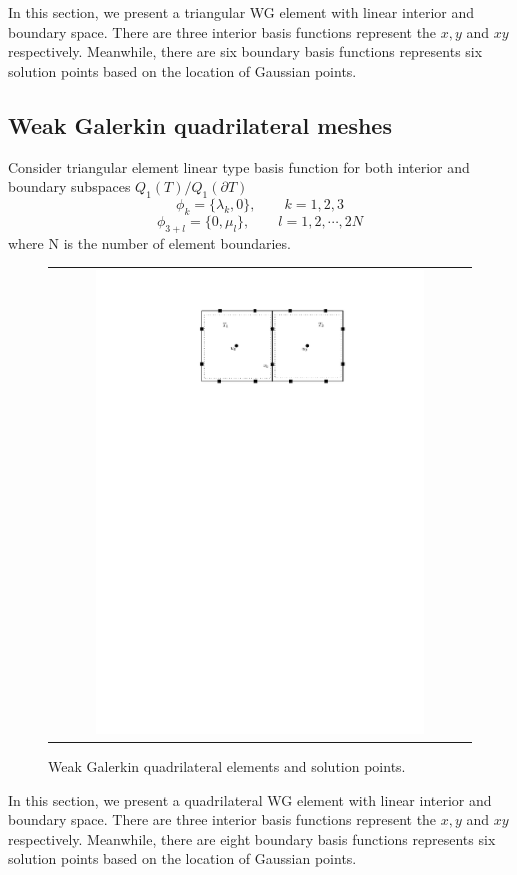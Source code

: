 In this section, we present a triangular WG element with linear interior and boundary space. There are three interior basis functions represent the $ x, y $ and $ xy $ respectively. Meanwhile, there are six boundary basis functions represents six solution points based on the location of Gaussian points.

\subsection{Weak Galerkin quadrilateral meshes}

Consider triangular element linear type basis function for both interior and boundary subspaces $ Q_{1}(T) / Q_{1} (\partial T) $
\begin{equation}
\phi_{k} = \{ \lambda_{k}, 0 \}, \qquad k = 1,2, 3
\end{equation}
\begin{equation}
\phi_{3 + l} = \{ 0, \mu_{l} \}, \qquad l = 1, 2, \cdots , 2N
\end{equation}
where N is the number of element boundaries.
\begin{figure}[h]
	\centering
	\begin{tabular}{c}
		\includegraphics[width=0.8\textwidth]{./pics/quad.pdf}
	\end{tabular}
	\caption{\footnotesize Weak Galerkin quadrilateral elements and solution points.}\label{fig2: quad}
\end{figure}

In this section, we present a quadrilateral WG element with linear interior and boundary space. There are three interior basis functions represent the $ x, y $ and $ xy $ respectively. Meanwhile, there are eight boundary basis functions represents six solution points based on the location of Gaussian points.

